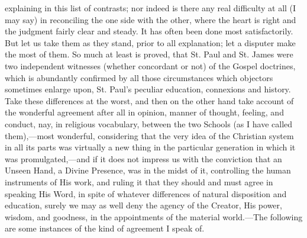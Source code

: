 explaining in this list of contrasts; nor indeed is there any real
difficulty at all (I may say) in reconciling the one side with the
other, where the heart is right and the judgment fairly clear and
steady. It has often been done most satisfactorily. But let us take them
as they stand, prior to all explanation; let a disputer make the most of
them. So much at least is proved, that St. Paul and St. James were two
independent witnesses (whether concordant or not) of the Gospel
doctrines, which is abundantly confirmed by all those circumstances
which objectors sometimes enlarge upon, St. Paul's peculiar education,
connexions and history. Take these differences at the worst, and then on
the other hand take account of the wonderful agreement after all in
opinion, manner of thought, feeling, and conduct, nay, in religious
vocabulary, between the two Schools (as I have called them),—most
wonderful, considering that the very idea of the Christian system in all
its parts was virtually a new thing in the particular generation in
which it was promulgated,—and if it does not impress us with the
conviction that an Unseen Hand, a Divine Presence, was in the midst of
it, controlling the human instruments of His work, and ruling it that
they should and must agree in speaking His Word, in spite of whatever
differences of natural disposition and education, surely we may as well
deny the agency of the Creator, His power, wisdom, and goodness, in the
appointments of the material world.—The following are some instances of
the kind of agreement I speak of.

